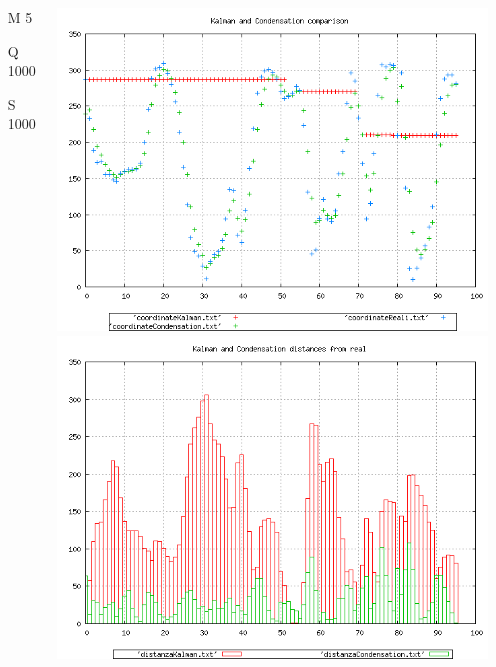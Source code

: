 \documentclass{beamer}
\begin{document}
{\begin{columns}
\begin{scriptsize}
\begin{itemize}
\item [M]5
\item [Q]1000
\item [S]1000
\end{itemize}
\end{scriptsize}
\includegraphics[scale=0.1]{../esperimenti/tappeto_nozoom/mod_5-Q_1000-S_1000/plot.png}\\
\includegraphics[scale=0.1]{../esperimenti/tappeto_nozoom/mod_5-Q_1000-S_1000/plot-distances.png}



\end{columns}}
\end{document}
